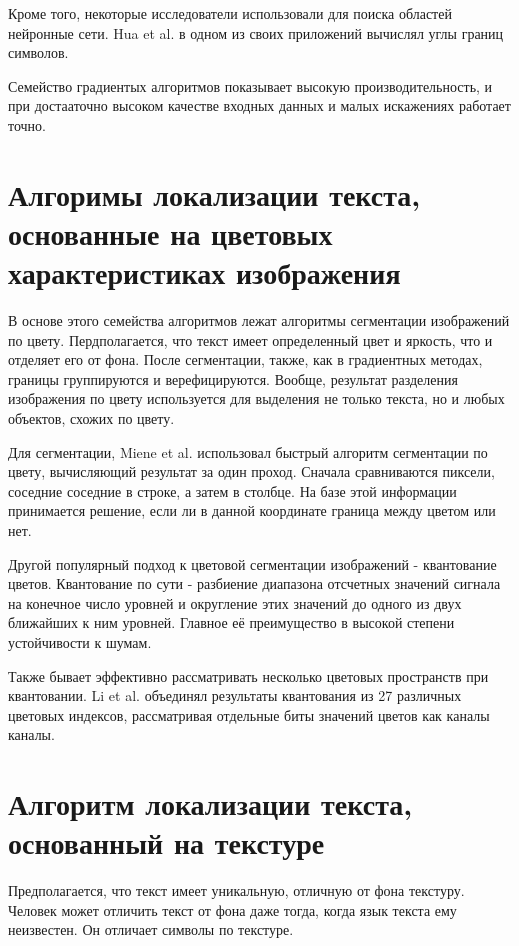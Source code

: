 \documentclass[oneside,final,14pt]{extreport}
\begin{document}
Кроме того, некоторые исследователи использовали для поиска областей нейронные сети.  Hua et al. \cite{Hua:text_loc} в одном из своих приложений вычислял углы границ символов. 

Семейство градиентых алгоритмов показывает высокую производительность, и при достааточно высоком качестве входных данных и малых искажениях работает точно.

\section{Алгоримы локализации текста, основанные на цветовых характеристиках изображения}

 В основе этого семейства алгоритмов лежат алгоритмы сегментации изображений по цвету. Пердполагается, что текст имеет определенный цвет и яркость, что и отделяет его от фона.  После сегментации, также, как в градиентных методах, границы группируются и верефицируются. Вообще,  результат разделения изображения по цвету используется для выделения не только текста, но и любых объектов, схожих по цвету.

Для сегментации, Miene et al. \cite{Miene:text_loc} использовал быстрый алгоритм сегментации по цвету, вычисляющий результат за один проход. Сначала сравниваются пиксели, соседние соседние в строке, а затем в столбце. На базе этой информации принимается решение, если ли в данной координате граница между цветом или нет.    

Другой популярный подход к цветовой сегментации изображений - квантование цветов. Квантование по сути - разбиение диапазона отсчетных значений сигнала на конечное число уровней и округление этих значений до одного из двух ближайших к ним уровней. Главное её преимущество в высокой степени устойчивости к шумам. 

Также бывает эффективно рассматривать несколько цветовых пространств при квантовании. Li et al. \cite{Li:text_loc} объединял результаты квантования из 27 различных цветовых индексов, рассматривая  отдельные биты значений цветов как каналы каналы. 

\section{Алгоритм локализации текста, основанный на текстуре}

Предполагается, что текст имеет уникальную, отличную от фона текстуру. Человек может отличить текст от фона даже тогда, когда язык текста ему неизвестен. Он отличает символы по текстуре. 
\end{document}
